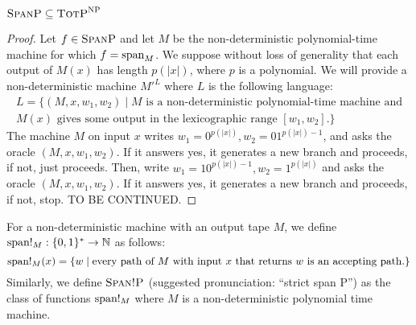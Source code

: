 \begin{theo}
	$\spanp \subseteq \totp^{\np}$
\end{theo}
\begin{proof}
	Let $f\in\spanp$ and let $M$ be the non-deterministic polynomial-time machine for which $f = \sp_M$. We suppose without loss of generality that each output of $M(x)$ has length $p(\vert x \vert)$, where $p$ is a polynomial. We will provide a non-deterministic machine $M'^L$ where $L$ is the following language:
	\begin{multline*}
	L = \{(M,x,w_1,w_2) \mid \text{$M$ is a non-deterministic polynomial-time machine and} \\ \text{$M(x)$ gives some output in the lexicographic range $[w_1,w_2]$.} \}
	\end{multline*}
	The machine $M$ on input $x$ writes $w_1 = 0^{p(\vert x \vert)}, w_2 = 01^{p(\vert x \vert)-1}$, and asks the oracle $(M,x,w_1,w_2)$. If it answers yes, it generates a new branch and proceeds, if not, just proceeds. Then, write $w_1 = 10^{p(\vert x \vert)-1}, w_2 = 1^{p(\vert x \vert)}$ and asks the oracle $(M,x,w_1,w_2)$. If it answers yes, it generates a new branch and proceeds, if not, stop. TO BE CONTINUED.
\end{proof}

For a non-deterministic machine with an output tape $M$, we define $\sp!_M:\{0,1\}^*\to\N$ as follows:
\[
	\sp!_M(x) = \{w \mid \text{every path of $M$ with input $x$ that returns $w$ is an accepting path.} \}
\]
Similarly, we define $\stspanp$ (suggested pronunciation: ``strict span P'') as the class of functions $\sp!_M$ where $M$ is a non-deterministic polynomial time machine.

